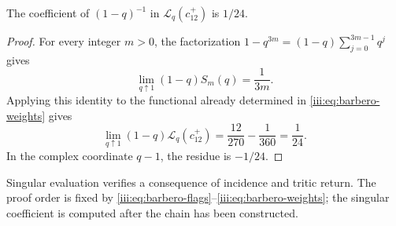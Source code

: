 \begin{proposition}
\label{iii:prop:barbero-pole}
The coefficient of $(1-q)^{-1}$ in
$\mathscr L_q(c_{12}^{+})$ is $1/24$.
\end{proposition}
\begin{proof}
For every integer $m>0$, the factorization
$1-q^{3m}=(1-q)\sum_{j=0}^{3m-1}q^j$ gives
\[
 \lim_{q\uparrow1}(1-q)S_m(q)=\frac1{3m}.
\]
Applying this identity to the functional already determined in
\eqref{iii:eq:barbero-weights} gives
\begin{equation}
 \lim_{q\uparrow1}(1-q)\mathscr L_q(c_{12}^{+})
 =\frac{12}{270}-\frac1{360}=\frac1{24}.
 \label{iii:eq:barbero-pole}
\end{equation}
In the complex coordinate $q-1$, the residue is $-1/24$.
\end{proof}

Singular evaluation verifies a consequence of incidence and tritic
return. The proof order is fixed by
\eqref{iii:eq:barbero-flags}--\eqref{iii:eq:barbero-weights}; the
singular coefficient is computed after the chain has been constructed.

